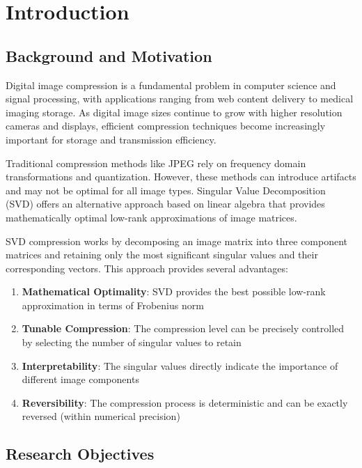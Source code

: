 \documentclass[12pt,a4paper]{article}
\begin{document}
\tableofcontents
\newpage

\section{Introduction}

\subsection{Background and Motivation}

Digital image compression is a fundamental problem in computer science and signal processing, with applications ranging from web content delivery to medical imaging storage. As digital image sizes continue to grow with higher resolution cameras and displays, efficient compression techniques become increasingly important for storage and transmission efficiency.

Traditional compression methods like JPEG rely on frequency domain transformations and quantization. However, these methods can introduce artifacts and may not be optimal for all image types. Singular Value Decomposition (SVD) offers an alternative approach based on linear algebra that provides mathematically optimal low-rank approximations of image matrices.

SVD compression works by decomposing an image matrix into three component matrices and retaining only the most significant singular values and their corresponding vectors. This approach provides several advantages:

\begin{enumerate}
    \item \textbf{Mathematical Optimality}: SVD provides the best possible low-rank approximation in terms of Frobenius norm
    \item \textbf{Tunable Compression}: The compression level can be precisely controlled by selecting the number of singular values to retain
    \item \textbf{Interpretability}: The singular values directly indicate the importance of different image components
    \item \textbf{Reversibility}: The compression process is deterministic and can be exactly reversed (within numerical precision)
\end{enumerate}

\subsection{Research Objectives}
\end{document}

